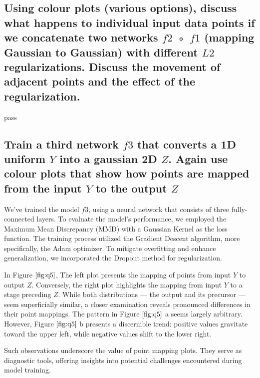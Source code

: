 \documentclass{article}
\begin{document}
\subsection{Using colour plots (various options), discuss what happens to individual
input data points if we concatenate two networks $f2$ ◦ $f1$ (mapping
Gaussian to Gaussian) with different $L2$ regularizations. Discuss the
movement of adjacent points and the effect of the regularization.}
\label{ssec:q4}

pass

\subsection{Train a third network $f3$ that converts a 1D uniform $Y$ into a gaussian
2D $Z$. Again use colour plots that show how points are mapped from
the input $Y$ to the output $Z$}
\label{ssec:q5}

We've trained the model $f3$, using a neural network that consists of three fully-connected layers. To evaluate the model's performance, we employed the Maximum Mean Discrepancy (MMD) with a Gaussian Kernel as the loss function. The training process utilized the Gradient Descent algorithm, more specifically, the Adam optimizer. To mitigate overfitting and enhance generalization, we incorporated the Dropout method for regularization.

In Figure $\ref{fig:q5}$, The left plot presents the mapping of points from input 
$Y$ to output $Z$.
Conversely, the right plot highlights the mapping from input 
$Y$ to a stage preceding $Z$.
While both distributions — the output and its precursor — seem superficially similar, a closer examination reveals pronounced differences in their point mappings. The pattern in 
Figure $\ref{fig:q5}$ a seems largely arbitrary. However, 
Figure $\ref{fig:q5}$ b presents a discernible trend: positive values gravitate toward the upper left, while negative values shift to the lower right.

Such observations underscore the value of point mapping plots. They serve as diagnostic tools, offering insights into potential challenges encountered during model training.
\end{document}
